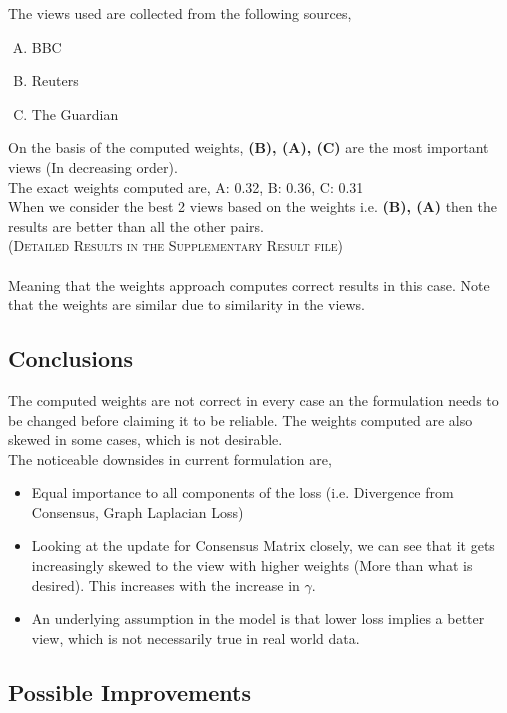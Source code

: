 \documentclass[a4paper]{article}
\begin{document}
	The views used are collected from the following sources,
	\vspace{-0.2cm}
	\begin{enumerate}[(A)]
	\setlength\itemsep{-0.05em}
		\item BBC
		\item Reuters
		\item The Guardian
	\end{enumerate}		

	On the basis of the computed weights, \textbf{(B), (A), (C)} are the most important views (In decreasing order).\\
	The exact weights computed are,	\textsc{A: 0.32, B:	0.36, C: 0.31}\\
	When we consider the best 2 views based on the weights i.e. \textbf{(B), (A)} then the results are better than all the other pairs.\\
	\null \hfill {\footnotesize{\textsc{(Detailed Results in the Supplementary Result file)}}}\\ \\
	Meaning that the weights approach computes correct results in this case. Note that the weights are similar due to similarity in the views.
	
	\subsection{Conclusions}
	
	The computed weights are not correct in every case an the formulation needs to be changed before claiming it to be reliable. The weights computed are also skewed in some cases, which is not desirable.\\
	The noticeable downsides in current formulation are, 
	\begin{itemize}
	\item Equal importance to all components of the loss (i.e. Divergence from Consensus, Graph Laplacian Loss)
	\item Looking at the update for Consensus Matrix closely, we can see that it gets increasingly skewed to the view with higher weights (More than what is desired). This increases with the increase in $\gamma$. 
	\item An underlying assumption in the model is that lower loss implies a better view, which is not necessarily true in real world data.
	\end{itemize}
	
	\subsection{Possible Improvements}
	
\end{document}
